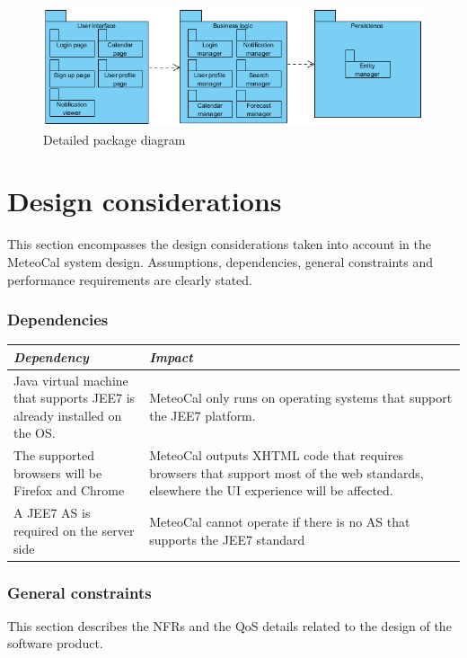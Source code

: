 \documentclass[10pt,a4paper,titlepage]{article}
\begin{document}
\begin{figure}[h!]
\centering
\includegraphics[width=\linewidth]{./images/detailed-package}
\caption[Detailed package]{Detailed package diagram}
\label{fig:detailed-package}
\end{figure}

\clearpage
\part{Design considerations}
\label{part:design-considerations}
This section encompasses the design considerations taken into account in the MeteoCal system design. Assumptions, dependencies, general constraints and performance requirements are clearly stated.

\section{Dependencies}
\begin{tabular}{| p{0.3\linewidth} | p{0.7\linewidth} |}
\hline	\emph{Dependency}	&	\emph{Impact}	\\
\hline	Java virtual machine that supports JEE7 is already installed on the OS. & MeteoCal only runs on operating systems that support the JEE7 platform.	\\
\hline	The supported browsers will be Firefox and Chrome & MeteoCal outputs XHTML code that requires browsers that support most of the web standards, elsewhere the UI experience will be affected.	\\
\hline	A JEE7 AS is required on the server side	&	MeteoCal cannot operate if there is no AS that supports the JEE7 standard	\\
\hline
\end{tabular}

\section{General constraints}
This section describes the NFRs and the QoS details related to the design of the software product.
\end{document}
